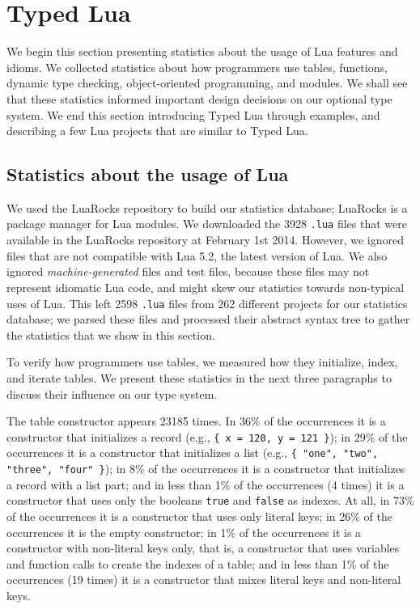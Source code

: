 \documentclass[preprint]{sig-alternate}
\begin{document}
\section{Typed Lua} \label{sec:proposal}

We begin this section presenting statistics about the usage of Lua
features and idioms.
We collected statistics about how programmers use tables, functions,
dynamic type checking, object-oriented programming, and modules.
We shall see that these statistics informed important design decisions
on our optional type system.
We end this section introducing Typed Lua through examples, and
describing a few Lua projects that are similar to Typed Lua. 

\subsection{Statistics about the usage of Lua}

We used the LuaRocks repository to build our statistics database;
LuaRocks \citep{hisham2013luarocks} is a package manager for Lua
modules.
We downloaded the 3928 \texttt{.lua} files that were available in
the LuaRocks repository at February 1st 2014.
However, we ignored files that are not compatible with Lua 5.2,
the latest version of Lua.
We also ignored \textit{machine-generated} files and test files,
because these files may not represent idiomatic Lua code,
and might skew our statistics towards non-typical uses of Lua.
This left 2598 \texttt{.lua} files from 262 different projects for
our statistics database;
we parsed these files and processed their abstract syntax tree
to gather the statistics that we show in this section.

To verify how programmers use tables, we measured how they
initialize, index, and iterate tables.
We present these statistics in the next three paragraphs to discuss
their influence on our type system.

The table constructor appears 23185 times.
In 36\% of the occurrences it is a constructor that initializes a
record (e.g., \texttt{\{ x = 120, y = 121 \}});
in 29\% of the occurrences it is a constructor that initializes a
list (e.g., \texttt{\{ "one", "two", "three", "four" \}});
in 8\% of the occurrences it is a constructor that initializes a
record with a list part;
and in less than 1\% of the occurrences (4 times) it is a constructor
that uses only the booleans \texttt{true} and \texttt{false} as indexes.
At all, in 73\% of the occurrences it is a constructor that uses
only literal keys;
in 26\% of the occurrences it is the empty constructor;
in 1\% of the occurrences it is a constructor with non-literal keys
only, that is, a constructor that uses variables and function calls
to create the indexes of a table;
and in less than 1\% of the occurrences (19 times) it is a constructor
that mixes literal keys and non-literal keys.
\end{document}
